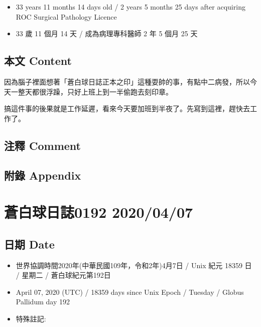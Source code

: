 \documentclass[a5paper, 12pt
]{book}
\providecommand{\tightlist}{%
  \setlength{\itemsep}{0pt}\setlength{\parskip}{0pt}}
\begin{document}
\begin{itemize}
\tightlist
\item
  33 years 11 months 14 days old / 2 years 5 months 25 days after
  acquiring ROC Surgical Pathology Licence
\item
  33 歲 11 個月 14 天 / 成為病理專科醫師 2 年 5 個月 25 天
\end{itemize}

\hypertarget{ux672cux6587-content-36}{%
\subsection{本文 Content}\label{ux672cux6587-content-36}}

因為腦子裡面想著「蒼白球日誌正本之印」這種耍帥的事，有點中二病發，所以今天一整天都很浮躁，只好上班上到一半偷跑去刻印章。

搞這件事的後果就是工作延遲，看來今天要加班到半夜了。先寫到這裡，趕快去工作了。

\hypertarget{ux6ce8ux91cb-comment-36}{%
\subsection{注釋 Comment}\label{ux6ce8ux91cb-comment-36}}

\hypertarget{ux9644ux9304-appendix-36}{%
\subsection{附錄 Appendix}\label{ux9644ux9304-appendix-36}}

\hypertarget{ux84bcux767dux7403ux65e5ux8a8c0192-20200407}{%
\section{蒼白球日誌0192
2020/04/07}\label{ux84bcux767dux7403ux65e5ux8a8c0192-20200407}}

\hypertarget{ux65e5ux671f-date-37}{%
\subsection{日期 Date}\label{ux65e5ux671f-date-37}}

\begin{itemize}
\tightlist
\item
  世界協調時間2020年(中華民國109年，令和2年)4月7日 / Unix 紀元 18359 日
  / 星期二 / 蒼白球紀元第192日
\item
  April 07, 2020 (UTC) / 18359 days since Unix Epoch / Tuesday / Globus
  Pallidum day 192
\item
  特殊註記:
\end{itemize}
\end{document}
